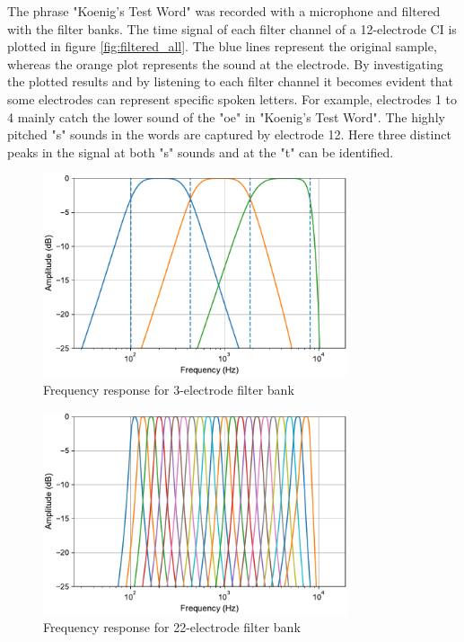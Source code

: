 \documentclass{scrartcl}
\begin{document}
The phrase "Koenig's Test Word" was recorded with a microphone and filtered with the filter banks. The time signal of each filter channel of a 12-electrode CI is plotted in figure \ref{fig:filtered_all}. The blue lines represent the original sample, whereas the orange plot represents the sound at the electrode. By investigating the plotted results and by listening to each filter channel it becomes evident that some electrodes can represent specific spoken letters. For example, electrodes 1 to 4 mainly catch the lower sound of the "oe" in "Koenig's Test Word". The highly pitched "s" sounds in the words are captured by electrode 12. Here three distinct peaks in the signal at both "s" sounds and at the "t" can be identified. 

\newpage

\begin{figure}[h]
	\centering
	\includegraphics[width=0.8\textwidth]{figures/freq_response_CI_3}
	\caption{Frequency response for 3-electrode filter bank}
	\label{fig:f_3}
\end{figure}
\begin{figure}[h!]
	\centering
	\includegraphics[width=0.8\textwidth]{figures/freq_response_CI_22}
	\caption{Frequency response for 22-electrode filter bank}
	\label{fig:f_22}
\end{figure}
\end{document}
